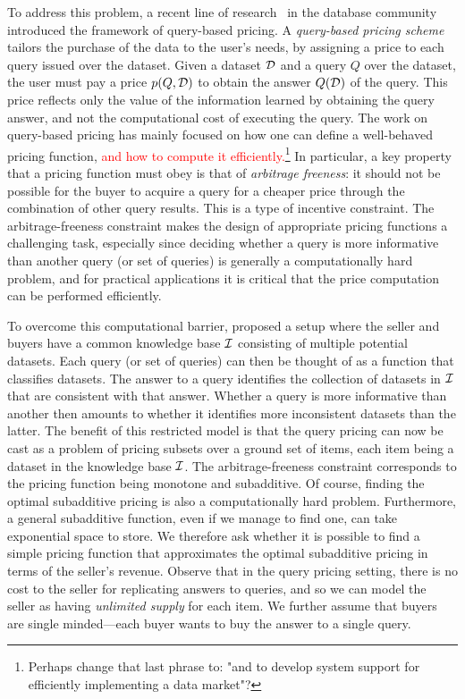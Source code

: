 To address this problem, a recent line of research~\cite{KUBHS12,KUBHS13,deep2017qirana} in the database community introduced the framework of  query-based pricing. A {\em query-based pricing scheme} tailors the purchase of the data to the user's needs, by assigning a price to each query issued over the dataset. Given a dataset $\mathcal{D}$ and a query $Q$ over the dataset, the user must pay a price $p(Q,\mathcal{D})$ to obtain the answer $Q(\mathcal{D})$ of the query. This price reflects only the value of the information learned by obtaining the query answer, and not the computational cost of executing the query. The work on query-based pricing has mainly focused on how one can define a well-behaved pricing function, \textcolor{red}{and how to compute it efficiently.\footnote{Perhaps change that last phrase to: "and to develop system support for efficiently implementing a data market"?}} In particular, a key property that a pricing function must obey is that of {\em arbitrage freeness}: it should not be possible for the buyer to acquire a query for a cheaper price through the combination of other query results. This is a type of incentive constraint. The arbitrage-freeness constraint makes the design of appropriate pricing functions a challenging task, especially since deciding whether a query is more informative than another query (or set of queries) is generally a computationally hard problem, and for practical applications it is critical that the price computation can be performed efficiently.

To overcome this computational barrier, \citet{deep2017qirana} proposed a setup where the seller and buyers have a common knowledge base $\mathcal{I}$ consisting of multiple potential datasets. Each query (or set of queries) can then be thought of as a function that classifies datasets. The answer to a query identifies the collection of datasets in $\mathcal{I}$ that are consistent with that answer. Whether a query is more informative than another then amounts to whether it identifies more inconsistent datasets than the latter. The benefit of this restricted model is that the query pricing can now be cast as a problem of pricing subsets over a ground set of items, each item being a dataset in the knowledge base $\mathcal{I}$. The arbitrage-freeness constraint corresponds to the pricing function being monotone and subadditive. Of course, finding the optimal subadditive pricing is also a computationally hard problem. Furthermore, a general subadditive function, even if we manage to find one, can take exponential space to store. We therefore ask whether it is possible to find a simple pricing function that approximates the optimal subadditive pricing in terms of the seller's revenue. Observe that in the query pricing setting, there is no cost to the seller for replicating answers to queries, and so we can model the seller as having {\em unlimited supply} for each item. We further assume that buyers are single minded---each buyer wants to buy the answer to a single query.

